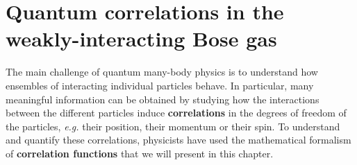 
\chapter{Quantum correlations in the weakly-interacting Bose gas}

\label{sec:chapter_1}

\fancyhead[LO]{\rightmark} %
\fancyhead[RE]{\leftmark}







The main challenge of quantum many-body physics is to understand how ensembles of interacting individual particles behave. In particular, many meaningful information can be obtained by studying how the interactions between the different particles induce \textbf{correlations} in the degrees of freedom of the particles, {\it e.g.} their position, their momentum or their spin. To understand and quantify these correlations, physicists have used the mathematical formalism of \textbf{correlation functions} that we will present in this chapter. 

